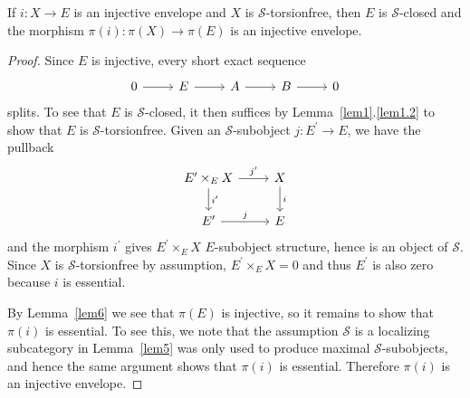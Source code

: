 \documentclass[dissertation.tex]{subfiles}
\begin{document}
\begin{lem}\label{lem7}
  If $i \colon X \rightarrow E$ is an injective envelope and $X$ is $\mathcal{S}$-torsionfree, then $E$ is $\mathcal{S}$-closed and the morphism $\pi(i) \colon \pi(X) \rightarrow \pi(E)$ is an injective envelope.

  \begin{proof}
    Since $E$ is injective, every short exact sequence
    $$\begin{tikzcd}
      0 \arrow{r} & E \arrow{r} & A \arrow{r} & B \arrow{r} & 0
    \end{tikzcd}$$
    splits.  
    To see that $E$ is $\mathcal{S}$-closed, it then suffices by Lemma~\ref{lem1}.\ref{lem1.2} to show that $E$ is $\mathcal{S}$-torsionfree.
    Given an $\mathcal{S}$-subobject $j : E^\prime \rightarrow E$, we have the pullback 
    $$\begin{tikzcd}
      E^\prime \times_E X \arrow{r}{j^\prime}\arrow{d}{i^\prime} & X\arrow{d}{i}\\
      E^\prime \arrow{r}{j} & E
    \end{tikzcd}$$
    and the morphism $i^\prime$ gives $E^\prime \times_E X$ $E$-subobject structure, hence is an object of $\mathcal{S}$.
    Since $X$ is $\mathcal{S}$-torsionfree by assumption, $E^\prime \times_E X = 0$ and thus $E^\prime$ is also zero because $i$ is essential.
    
    By Lemma~\ref{lem6} we see that $\pi(E)$ is injective, so it remains to show that $\pi(i)$ is essential.
    To see this, we note that the assumption $\mathcal{S}$ is a localizing subcategory in Lemma~\ref{lem5} was only used to produce maximal $\mathcal{S}$-subobjects, and hence the same argument shows that $\pi(i)$ is essential.
    Therefore $\pi(i)$ is an injective envelope.
  \end{proof}
\end{lem}
\end{document}

